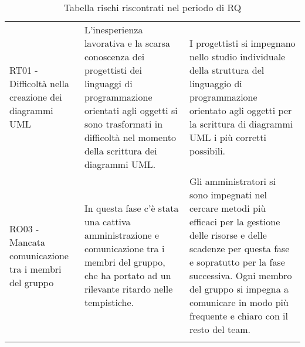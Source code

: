 \documentclass[../piano_di_progetto.tex]{subfiles}
\begin{document}
\begin{center}
\begin{longtable}{|p{4cm}|p{6cm}|p{6cm}|}
		RT01 - Difficoltà nella creazione dei diagrammi UML
		& L'inesperienza lavorativa e la scarsa conoscenza dei progettisti dei linguaggi di programmazione orientati agli oggetti si sono trasformati in difficoltà nel momento della scrittura dei diagrammi UML. 
		& I progettisti si impegnano nello studio individuale della struttura del linguaggio di programmazione orientato agli oggetti per la scrittura di diagrammi UML i più corretti possibili. \\

		RO03 - Mancata comunicazione tra i membri del gruppo
		& In questa fase c'è stata una cattiva amministrazione e comunicazione tra i membri del gruppo, che ha portato ad un rilevante ritardo nelle tempistiche.
		& Gli amministratori si sono impegnati nel cercare metodi più efficaci per la gestione delle risorse e delle scadenze per questa fase e sopratutto per la fase successiva. Ogni membro del gruppo si impegna a comunicare in modo più frequente e chiaro con il resto del team. \\
		\hline
		\rowcolor{white}
		\caption{Tabella rischi riscontrati nel periodo di RQ}
	\end{longtable}

\end{center}
\end{document}
